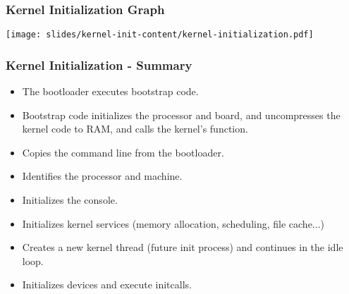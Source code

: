 \begin{frame}
  \frametitle{Kernel Initialization Graph}
  \begin{center}
    \texttt{[image: slides/kernel-init-content/kernel-initialization.pdf]}
  \end{center}
\end{frame}

\begin{frame}
  \frametitle{Kernel Initialization - Summary}
  \begin{itemize}
  \item The bootloader executes bootstrap code.
  \item Bootstrap code initializes the processor and board, and
    uncompresses the kernel code to RAM, and calls the kernel's
     function.
  \item Copies the command line from the bootloader.
  \item Identifies the processor and machine.
  \item Initializes the console.
  \item Initializes kernel services (memory allocation, scheduling,
    file cache...)
  \item Creates a new kernel thread (future init process) and
    continues in the idle loop.
  \item Initializes devices and execute initcalls.
  \end{itemize}
\end{frame}
